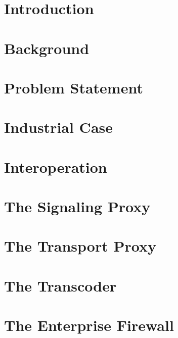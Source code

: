 \chapter{Introduction}


\chapter{Background}


\chapter{Problem Statement}


\chapter{Industrial Case}


\chapter{Interoperation}


\chapter{The Signaling Proxy}

\chapter{The Transport Proxy}

\chapter{The Transcoder}

\chapter{The Enterprise Firewall}

% 

% 

